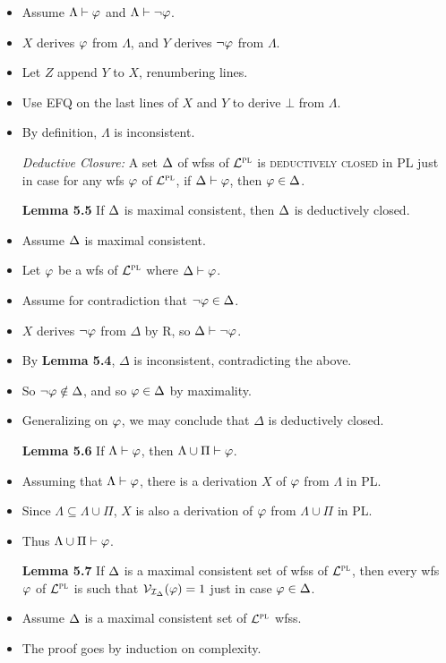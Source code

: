 \documentclass[a4paper, 11pt]{article} %
\begin{document}
\begin{itemize}
    \item Assume $\Lambda\vdash\varphi$ and $\Lambda\vdash\neg\varphi$.
    \item $X$ derives $\varphi$ from $\Lambda$, and $Y$ derives $\neg\varphi$ from $\Lambda$. 
    \item Let $Z$ append $Y$ to $X$, renumbering lines.
    \item Use EFQ on the last lines of $X$ and $Y$ to derive $\bot$ from $\Lambda$. 
    \item By definition, $\Lambda$ is inconsistent.
  \item[\it Deductive Closure:] A set $\Delta$ of wfss of $\mathcal{L}^{\textsc{pl}}$ is \textsc{deductively closed} in PL just in case for any wfs $\varphi$ of $\mathcal{L}^{\textsc{pl}}$, if $\Delta\vdash\varphi$, then $\varphi\in\Delta$.
  \item[\bf Lemma 5.5] If $\Delta$ is maximal consistent, then $\Delta$ is deductively closed.
    \item Assume $\Delta$ is maximal consistent.
    \item Let $\varphi$ be a wfs of $\mathcal{L}^{\textsc{pl}}$ where $\Delta\vdash\varphi$.
    \item Assume for contradiction that $\neg\varphi \in \Delta$.
    \item $X$ derives $\neg\varphi$ from $\Delta$ by R, so $\Delta \vdash \neg\varphi$.
    \item By \textbf{Lemma 5.4}, $\Delta$ is inconsistent, contradicting the above.
    \item So $\neg\varphi\notin\Delta$, and so $\varphi \in \Delta$ by maximality. 
    \item Generalizing on $\varphi$, we may conclude that $\Delta$ is deductively closed. 
  \item[\bf Lemma 5.6] If $\Lambda\vdash\varphi$, then $\Lambda\cup\Pi\vdash\varphi$.
    \item Assuming that $\Lambda\vdash\varphi$, there is a derivation $X$ of $\varphi$ from $\Lambda$ in PL.
    \item Since $\Lambda\subseteq\Lambda\cup\Pi$, $X$ is also a derivation of $\varphi$ from $\Lambda\cup\Pi$ in PL.
    \item Thus $\Lambda\cup\Pi\vdash\varphi$. 
  \item[\bf Lemma 5.7] If $\Delta$ is a maximal consistent set of wfss of $\mathcal{L}^{\textsc{pl}}$, then every wfs $\varphi$ of $\mathcal{L}^{\textsc{pl}}$ is such that $\mathcal{V}_{\mathcal{I}_{\Delta}}(\varphi) = 1$ just in case $\varphi\in\Delta$.  
    \item Assume $\Delta$ is a maximal consistent set of $\mathcal{L}^{\textsc{pl}}$ wfss.
    \item The proof goes by induction on complexity.

\end{itemize}
\end{document}
